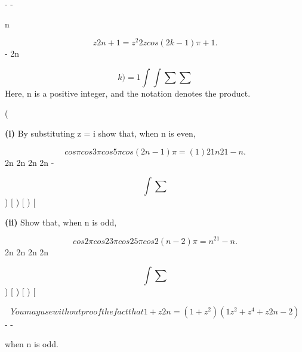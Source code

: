 \documentclass[12pt]{article}
\begin{document}
\begin{flushleft}
- -\par
n\par
\[z2n + 1 = z^2 2z cos (2k-1)\pi + 1 .\]
- 2n\par
\[k ) =1 \int \int \sum \sum\]
Here, n is a positive integer, and the notation denotes the product.\par
(\par
\textbf{(i)} By substituting z = i show that, when n is even,\par
\[cos \pi cos 3\pi cos 5\pi cos (2n-1)\pi = ( 1) 2 1 n 21-n .\]
2n 2n 2n \cdots 2n -\par
\[\int \sum\]
) [ ) [ ) [\par
\textbf{(ii)} Show that, when n is odd,\par
\[cos2 \pi cos2 3\pi cos2 5\pi cos2 (n-2)\pi = n^21-n .\]
2n 2n 2n \cdots 2n\par
\[\int \sum\]
) [ ) [ ) [\par
\[You may use without proof the fact that 1 + z2n = (1 + z^2)(1 z^2 + z^4 + z2n-2)\]
- - \cdots\par
when n is odd.\par
\end{flushleft}
\end{document}
